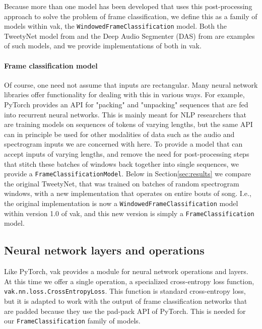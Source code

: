 Because more than one model has been developed that uses this post-processing approach to solve the problem of frame classification,
we define this as a family of models within vak, the \texttt{WindowedFrameClassification} model.
Both the TweetyNet model from \citet{cohenAutomatedAnnotationBirdsong2022} and the Deep Audio Segmenter (DAS) from \citet{steinfathFastAccurateAnnotation2021} are examples of such models, and we provide implementations of both in vak.

\paragraph{Frame classification model \label{p:frame-classification-model}}

Of course, one need not assume that inputs are rectangular.
Many neural network libraries offer functionality for dealing with this in various ways.
For example, PyTorch provides an API for "packing" and "unpacking" sequences
that are fed into recurrent neural networks.
This is mainly meant for NLP researchers
that are training models on sequences of tokens of varying lengths,
but the same API can in principle be used for other modalities of data
such as the audio and spectrogram inputs we are concerned with here.
To provide a model that can accept inputs of varying lengths,
and remove the need for post-processing steps that stitch these batches of windows
back together into single sequences,
we provide a \texttt{FrameClassificationModel}.
Below in Section\ref{sec:results} we compare the original TweetyNet,
that was trained on batches of random spectrogram windows,
with a new implementation that operates on entire bouts of song.
I.e., the original implementation is now a
\texttt{WindowedFrameClassification} model within version 1.0 of vak,
and this new version is simply a \texttt{FrameClassification} model.

\subsection{Neural network layers and operations \label{subsec:layers}}

Like PyTorch, vak provides a module for neural network operations and layers.
At this time we offer a single operation,
a specialized cross-entropy loss function,
\texttt{vak.nn.loss.CrossEntropyLoss}.
This function is standard cross-entropy loss,
but it is adapted to work with the output of frame classification networks
that are padded because they use the pad-pack API of PyTorch.
This is needed for our \texttt{FrameClassification} family of models.

